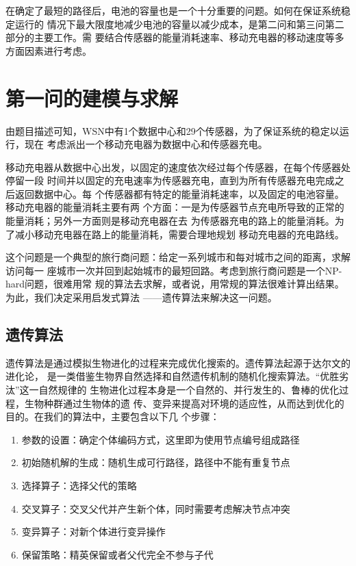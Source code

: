 \documentclass{ctexart}
\begin{document}
    在确定了最短的路径后，电池的容量也是一个十分重要的问题。如何在保证系统稳定运行的
    情况下最大限度地减少电池的容量以减少成本，是第二问和第三问第二部分的主要工作。需
    要结合传感器的能量消耗速率、移动充电器的移动速度等多方面因素进行考虑。


    \section{第一问的建模与求解}
    由题目描述可知，WSN中有1个数据中心和29个传感器，为了保证系统的稳定以运行，现在
    考虑派出一个移动充电器为数据中心和传感器充电。

    移动充电器从数据中心出发，以固定的速度依次经过每个传感器，在每个传感器处停留一段
    时间并以固定的充电速率为传感器充电，直到为所有传感器充电完成之后返回数据中心。每
    个传感器都有特定的能量消耗速率，以及固定的电池容量。移动充电器的能量消耗主要有两
    个方面：一是为传感器节点充电所导致的正常的能量消耗；另外一方面则是移动充电器在去
    为传感器充电的路上的能量消耗。为了减小移动充电器在路上的能量消耗，需要合理地规划
    移动充电器的充电路线。

    这个问题是一个典型的旅行商问题：给定一系列城市和每对城市之间的距离，求解访问每一
    座城市一次并回到起始城市的最短回路。考虑到旅行商问题是一个NP-hard问题，很难用常
    规的算法去求解，或者说，用常规的算法很难计算出结果。为此，我们决定采用启发式算法
    ——遗传算法来解决这一问题。

    \subsection{遗传算法}
    遗传算法是通过模拟生物进化的过程来完成优化搜索的。遗传算法起源于达尔文的进化论，
    是一类借鉴生物界自然选择和自然遗传机制的随机化搜索算法。“优胜劣汰”这一自然规律的
    生物进化过程本身是一个自然的、并行发生的、鲁棒的优化过程，生物种群通过生物体的遗
    传、变异来提高对环境的适应性，从而达到优化的目的。在我们的算法中，主要包含以下几
    个步骤：
    \begin{enumerate}[a]
        \item 参数的设置：确定个体编码方式，这里即为使用节点编号组成路径
        \item 初始随机解的生成：随机生成可行路径，路径中不能有重复节点
        \item 选择算子：选择父代的策略
        \item 交叉算子：交叉父代并产生新个体，同时需要考虑解决节点冲突
        \item 变异算子：对新个体进行变异操作
        \item 保留策略：精英保留或者父代完全不参与子代
    \end{enumerate}
\end{document}
